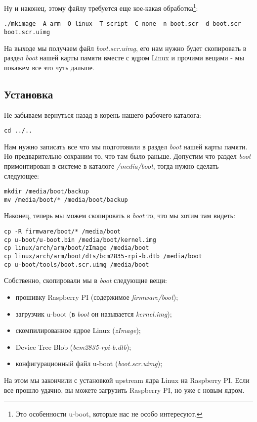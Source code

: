 Ну и наконец, этому файлу требуется еще кое-какая обработка\footnote{Это особенности
u-boot, которые нас не особо интересуют.}:
\begin{lstlisting}
./mkimage -A arm -O linux -T script -C none -n boot.scr -d boot.scr boot.scr.uimg
\end{lstlisting}

На выходе мы получаем файл \emph{boot.scr.uimg}, его нам нужно будет скопировать
в раздел \emph{boot} нашей карты памяти вместе с ядром Linux и прочими вещами -
мы покажем все это чуть дальше.

\subsection{Установка}

Не забываем вернуться назад в корень нашего рабочего каталога:
\begin{lstlisting}
cd ../..
\end{lstlisting}

Нам нужно записать все что мы подготовили в раздел \emph{boot} нашей карты
памяти. Но предварительно сохраним то, что там было раньше. Допустим что раздел
\emph{boot} примонтирован в системе в каталоге \emph{/media/boot}, тогда нужно
сделать следующее:
\begin{lstlisting}
mkdir /media/boot/backup
mv /media/boot/* /media/boot/backup
\end{lstlisting}

Наконец, теперь мы можем скопировать в \emph{boot} то, что мы хотим там видеть:
\begin{lstlisting}
cp -R firmware/boot/* /media/boot
cp u-boot/u-boot.bin /media/boot/kernel.img
cp linux/arch/arm/boot/zImage /media/boot
cp linux/arch/arm/boot/dts/bcm2835-rpi-b.dtb /media/boot
cp u-boot/tools/boot.scr.uimg /media/boot
\end{lstlisting}

Собственно, скопировали мы в \emph{boot} следующие вещи:
\begin{itemize}
  \item прошивку Raspberry PI (содержимое \emph{firmware/boot});
  \item загрузчик u-boot (в \emph{boot} он называется \emph{kernel.img});
  \item скомпилированное ядрое Linux (\emph{zImage});
  \item Device Tree Blob (\emph{bcm2835-rpi-b.dtb});
  \item конфигурационный файл u-boot (\emph{boot.scr.uimg});
\end{itemize}

На этом мы закончили с установкой upstream ядра Linux на Raspberry PI. Если все
прошло удачно, вы можете загрузить Raspberry PI, но уже с новым ядром.

